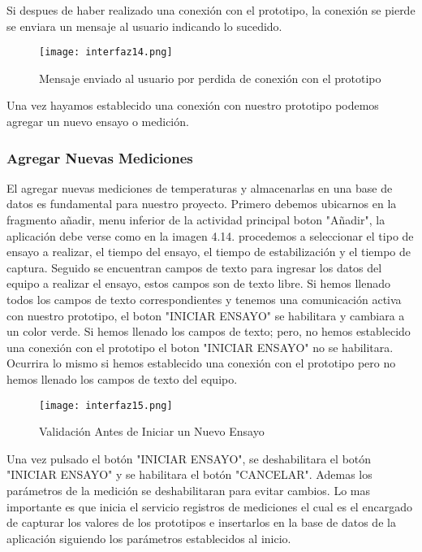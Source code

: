 \par \noindent
Si despues de haber realizado una conexión con el prototipo, la conexión se pierde se enviara un mensaje al usuario indicando lo sucedido.

\begin{figure}[H]
	\centering
	\texttt{[image: interfaz14.png]}
	\caption{Mensaje enviado al usuario por perdida de conexión con el prototipo}
\end{figure}

\par \noindent
Una vez hayamos establecido una conexión con nuestro prototipo podemos agregar un nuevo ensayo o medición.

\subsubsection{Agregar Nuevas Mediciones}

\par 
El agregar nuevas mediciones de temperaturas y almacenarlas en una base de datos es fundamental para nuestro proyecto. Primero debemos ubicarnos en la fragmento añadir, menu inferior de la actividad principal boton "Añadir", la aplicación debe verse como en la imagen 4.14. procedemos a seleccionar el tipo de ensayo a realizar, el tiempo del ensayo, el tiempo de estabilización y el tiempo de captura. Seguido se encuentran campos de texto para ingresar los datos del equipo a realizar el ensayo, estos campos son de texto libre. Si hemos llenado todos los campos de texto correspondientes y tenemos una comunicación activa con nuestro prototipo, el boton "INICIAR ENSAYO" se habilitara y cambiara a un color verde. Si hemos llenado los campos de texto; pero, no hemos establecido una conexión con el prototipo el boton "INICIAR ENSAYO" no se habilitara. Ocurrira lo mismo si hemos establecido una conexión con el prototipo pero no hemos llenado los campos de texto del equipo.

\begin{figure}[H]
	\centering
	\texttt{[image: interfaz15.png]}
	\caption{Validación Antes de Iniciar un Nuevo Ensayo}
\end{figure}

\par \noindent 
Una vez pulsado el botón "INICIAR ENSAYO", se deshabilitara el botón "INICIAR ENSAYO" y se habilitara el botón "CANCELAR". Ademas los parámetros de la medición se deshabilitaran para evitar cambios. Lo mas importante es que inicia el servicio registros de mediciones el cual es el encargado de capturar los valores de los prototipos e insertarlos en la base de datos de la aplicación siguiendo los parámetros establecidos al inicio. 

